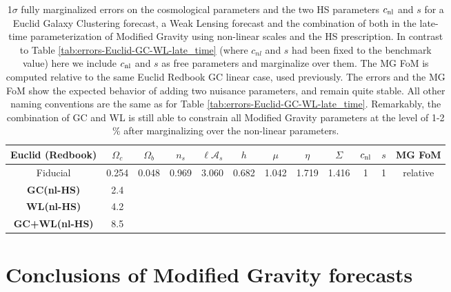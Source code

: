 \begin{table}[htbp]
\centering{}%
\tiny
\begin{tabular}{|c|c|c|c|c|c||c|c|c||c|c|c|}
\hline 
\textbf{Euclid} (Redbook)  & $\Omega_{c}$  & $\Omega_{b}$  & $n_{s}$  &
$\ell\mathcal{A}_{s}$  & $h$  & $\mu$  & $\eta$  & $\Sigma$ \Tstrut &
$c_{\mathrm{nl}}$  & $s$ & MG FoM \tabularnewline
\hline 
\Tstrut Fiducial  & {0.254}  & {0.048}  & {0.969}  & {3.060}  & {0.682}  & {1.042}  & {1.719}  & {1.416}  & {1}  & {1} & relative \tabularnewline
\hline
\hline
\Tstrut \textbf{GC(nl-HS)}   
& 2.4 \tabularnewline 
\Tstrut \textbf{WL(nl-HS)}    
& 4.2 \tabularnewline 
\Tstrut \textbf{GC+WL(nl-HS)}   
& 8.5 \tabularnewline
\hline 
\end{tabular}
\small
\protect\caption[1$\sigma$ forecasted errors on the cosmological parameters for a Euclid GC and WL survey, marginalizing over
the HS non-linear prescription parameters.]{\label{tab:errors-GC+WL-Marginalize-HS-Zhao-Euclid-DEpar-muetasigma}
1$\sigma$ fully marginalized errors on the cosmological parameters
and the two HS parameters $c_{\mathrm{nl}}$ and $s$ for a Euclid Galaxy
Clustering forecast, a Weak Lensing forecast and the combination of
both in the late-time parameterization of Modified Gravity using non-linear
scales and the HS prescription. In contrast to Table
\ref{tab:errors-Euclid-GC-WL-late_time} (where $c_{nl}$ and $s$ had been fixed to the benchmark value)
here we include $c_{\mathrm{nl}}$ and $s$ as free parameters
and marginalize over them. The MG FoM is computed relative to the same Euclid Redbook GC 
linear case,
used previously. The errors and the MG FoM show the expected behavior
of adding two nuisance parameters, and remain quite stable. All other naming conventions are the
same as for Table \ref{tab:errors-Euclid-GC-WL-late_time}. Remarkably, the combination of GC and WL is still able to constrain all Modified Gravity parameters at the level of 1-2 $\%$ after marginalizing over the non-linear parameters.}
\end{table}
\normalsize

\section{Conclusions of Modified Gravity forecasts}




